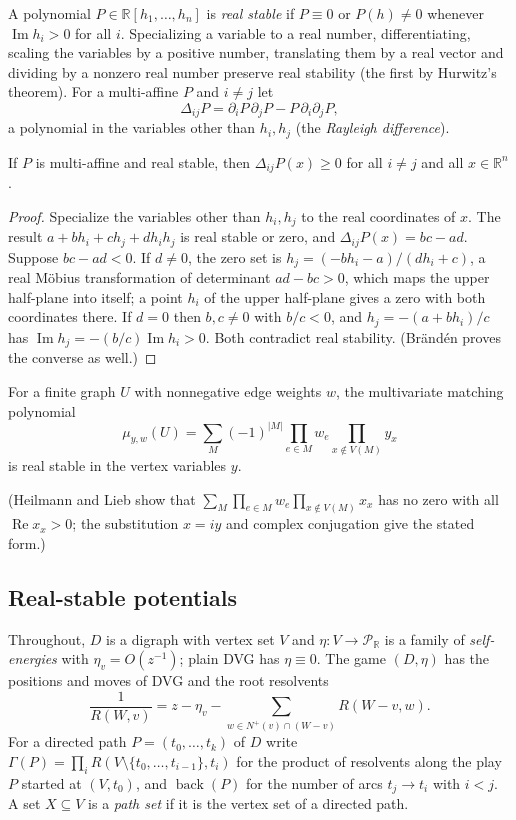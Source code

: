 \documentclass[final]{siamart0516}
\numberwithin{theorem}{section}
\numberwithin{equation}{section}
\theoremstyle{siamnonum}
\theoremstyle{plain}
\newcommand{\RR}{\mathbb{R}}
\newcommand{\Puis}{\mathcal{P}_{\RR}}
\newcommand{\back}{\operatorname{back}}
\renewcommand{\Im}{\operatorname{Im}}
\newcommand{\nplus}{N^{+}}
\begin{document}
A polynomial $P\in\RR[h_1,\dots,h_n]$ is \emph{real stable} if $P\equiv0$ or $P(h)\neq0$ whenever $\Im h_i>0$ for all $i$. Specializing a variable to a real number, differentiating, scaling the variables by a positive number, translating them by a real vector and dividing by a nonzero real number preserve real stability (the first by Hurwitz's theorem). For a multi-affine $P$ and $i\ne j$ let
\[
\Delta_{ij}P=\partial_iP\,\partial_jP-P\,\partial_i\partial_jP,
\]
a polynomial in the variables other than $h_i,h_j$ (the \emph{Rayleigh difference}).

\begin{lemma}\label{lem:branden}
If $P$ is multi-affine and real stable, then $\Delta_{ij}P(x)\ge0$ for all $i\ne j$ and all $x\in\RR^n$.
\end{lemma}
\begin{proof}
Specialize the variables other than $h_i,h_j$ to the real coordinates of $x$. The result $a+bh_i+ch_j+dh_ih_j$ is real stable or zero, and $\Delta_{ij}P(x)=bc-ad$. Suppose $bc-ad<0$. If $d\neq0$, the zero set is $h_j=(-bh_i-a)/(dh_i+c)$, a real M\"obius transformation of determinant $ad-bc>0$, which maps the upper half-plane into itself; a point $h_i$ of the upper half-plane gives a zero with both coordinates there. If $d=0$ then $b,c\ne0$ with $b/c<0$, and $h_j=-(a+bh_i)/c$ has $\Im h_j=-(b/c)\Im h_i>0$. Both contradict real stability. (Br\"and\'en proves the converse as well.)
\end{proof}

\begin{theorem}\label{thm:hl}
For a finite graph $U$ with nonnegative edge weights $w$, the multivariate matching polynomial
\[
\mu_{y,w}(U)=\sum_M(-1)^{|M|}\prod_{e\in M}w_e\prod_{x\notin V(M)}y_x
\]
is real stable in the vertex variables $y$.
\end{theorem}
\noindent(Heilmann and Lieb show that $\sum_M\prod_{e\in M}w_e\prod_{x\notin V(M)}x_x$ has no zero with all $\operatorname{Re}x_x>0$; the substitution $x=iy$ and complex conjugation give the stated form.)

\subsection{Real-stable potentials}
Throughout, $D$ is a digraph with vertex set $V$ and $\eta\colon V\to\Puis$ is a family of \emph{self-energies} with $\eta_v=O(z^{-1})$; plain DVG has $\eta\equiv0$. The game $(D,\eta)$ has the positions and moves of DVG and the root resolvents
\[
\frac1{R(W,v)}=z-\eta_v-\sum_{w\in\nplus(v)\cap(W-v)}R(W-v,w).
\]
For a directed path $P=(t_0,\dots,t_k)$ of $D$ write $\Gamma(P)=\prod_{i}R(V\setminus\{t_0,\dots,t_{i-1}\},t_i)$ for the product of resolvents along the play $P$ started at $(V,t_0)$, and $\back(P)$ for the number of arcs $t_j\to t_i$ with $i<j$. A set $X\subseteq V$ is a \emph{path set} if it is the vertex set of a directed path.
\end{document}
